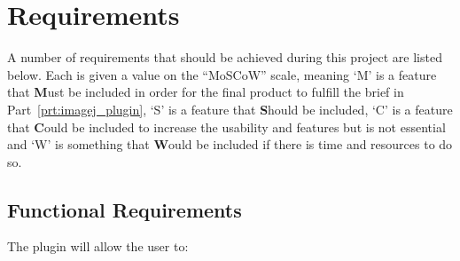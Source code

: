 
\section{Requirements}
\label{sec:requirements}

A number of requirements that should be achieved during this project are listed
below. Each is given a value on the ``MoSCoW'' scale, meaning `M' is a feature
that \textbf{M}ust be included in order for the final product to fulfill the
brief in Part~\ref{prt:imagej_plugin}, `S' is a feature that \textbf{S}hould
be included, `C' is a feature that \textbf{C}ould be included to increase the
usability and features but is not essential and `W' is something that
\textbf{W}ould be included if there is time and resources to do so.

\subsection{Functional Requirements}
\label{sub:functional_requirements}

The plugin will allow the user to:

